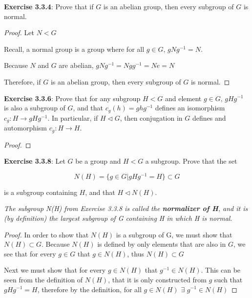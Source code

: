 \documentclass[a4paper]{article}
\begin{document}
\begin{myparindent}{0pt}
\textbf{Exercise 3.3.4}:
Prove that if $G$ is an abelian group, then every subgroup of $G$ is normal.
\newline

\begin{proof}

Let $N < G$

Recall, a normal group is a group where for all $g \in G$, $gNg^{-1} = N$.

Because $N$ and $G$ are abelian, $gNg^{-1} = Ngg^{-1} = Ne = N$

Therefore, if $G$ is an abelian group, then every subgroup of $G$ is normal.
\end{proof}

\textbf{Exercise 3.3.6}:
Prove that for any subgroup $H < G$ and element $g \in G$, $gHg^{-1}$ is also
a subgroup of $G$, and that $c_g(h) = ghg^{-1}$ defines an isomorphism
$c_g: H \rightarrow gHg^{-1}$. In particular, if $H \triangleleft G$, then
conjugation in $G$ defines and automorphism $c_g: H \rightarrow H$.
\newline

\begin{proof}
\end{proof}

\textbf{Exercise 3.3.8}:
Let $G$ be a group and $H < G$ a subgroup. Prove that the set

\[ N(H) = \{g \in G | gHg^{-1} = H \} \subset G \]
\newline

is a subgroup containing $H$, and that $H \triangleleft N(H)$.

\textit{The subgroup N(H) from Exercise 3.3.8 is called the
\textbf{normalizer of H}, and it is (by definition) the largest subgroup of G
containing H in which H is normal}.
\newline

\begin{proof}
  In order to show that $N(H)$ is a subgroup of G, we must show that
  $N(H) \subset G$. Because $N(H)$ is defined by only elements that are also in
  $G$, we see that for every $g \in G$ that $g \in N(H)$, thus $N(H) \subset G$
  \newline

  Next we must show that for every $g \in N(H)$ that $g^{-1} \in N(H)$. This can
  be seen from the definition of $N(H)$, that it is only constructed from $g$
  such that $gHg^{-1} = H$, therefore by the definition, for all
  $g \in N(H)$ $\exists$ $g^{-1} \in N(H)$
  \newline


\end{proof}
\end{myparindent}
\end{document}
